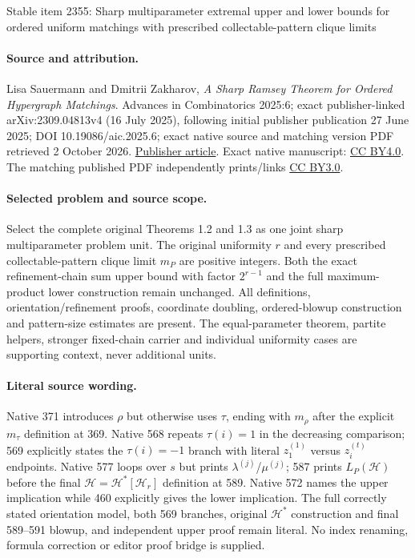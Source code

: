 \documentclass[11pt]{article}
\theoremstyle{definition}
\numberwithin{equation}{section}
\numberwithin{figure}{section}
\newcommand{\HH}{\mathcal{H}}
\begin{document}
\begin{center}{\Large Stable item 2355: Sharp multiparameter extremal upper and lower bounds for ordered uniform matchings with prescribed collectable-pattern clique limits}\end{center}
\paragraph{Source and attribution.} Lisa Sauermann and Dmitrii Zakharov, \emph{A Sharp Ramsey Theorem for Ordered Hypergraph Matchings}. Advances in Combinatorics 2025:6; exact publisher-linked arXiv:2309.04813v4 (16 July 2025), following initial publisher publication 27 June 2025; DOI 10.19086/aic.2025.6; exact native source and matching version PDF retrieved 2 October 2026. \href{https://www.advancesincombinatorics.com/article/140708-a-sharp-ramsey-theorem-for-ordered-hypergraph-matchings}{Publisher article}. Exact native manuscript: \href{https://creativecommons.org/licenses/by/4.0/}{CC BY4.0}. The matching published PDF independently prints/links \href{https://creativecommons.org/licenses/by/3.0/}{CC BY3.0}.
\paragraph{Selected problem and source scope.} Select the complete original Theorems 1.2 and 1.3 as one joint sharp multiparameter problem unit. The original uniformity \(r\) and every prescribed collectable-pattern clique limit \(m_P\) are positive integers. Both the exact refinement-chain sum upper bound with factor \(2^{r-1}\) and the full maximum-product lower construction remain unchanged. All definitions, orientation/refinement proofs, coordinate doubling, ordered-blowup construction and pattern-size estimates are present. The equal-parameter theorem, partite helpers, stronger fixed-chain carrier and individual uniformity cases are supporting context, never additional units.
\paragraph{Literal source wording.} Native 371 introduces \(\rho\) but otherwise uses \(\tau\), ending with \(m_\rho\) after the explicit \(m_\tau\) definition at 369. Native 568 repeats \(\tau(i)=1\) in the decreasing comparison; 569 explicitly states the \(\tau(i)=-1\) branch with literal \(z^{(1)}_1\) versus \(z^{(t)}_i\) endpoints. Native 577 loops over \(s\) but prints \(\lambda^{(j)}\)/\(\mu^{(j)}\); 587 prints \(L_P(\HH)\) before the final \(\HH=\HH^*[\HH_r]\) definition at 589. Native 572 names the upper implication while 460 explicitly gives the lower implication. The full correctly stated orientation model, both 569 branches, original \(\HH^*\) construction and final 589--591 blowup, and independent upper proof remain literal. No index renaming, formula correction or editor proof bridge is supplied.
\end{document}
